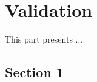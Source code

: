 

\chapter{Validation}
\label{chap:validation}

This part presents ...

\minitoc
\newpage

\section{Section 1}

